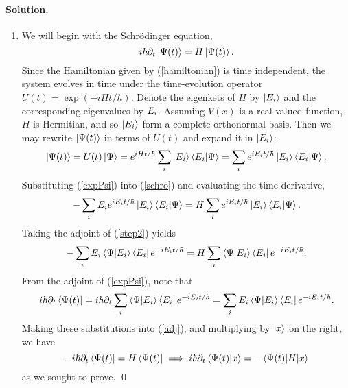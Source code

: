 \documentclass[11pt]{article}
\newcommand{\refeq}[1]{(\ref{#1})}
\newenvironment{solution}
{
    \paragraph{Solution.}
    \ignorespaces
}
{
}
\newcommand{\Schrodinger}{Schr\"{o}dinger}
\begin{document}
\begin{solution}
	\renewcommand{\theenumi}{\alph{enumi}}
	\begin{enumerate} \label{a}
		\item We will begin with the {\Schrodinger} equation,
			\begin{equation} \label{schro}
				i \hbar \partial_t \ket{\Psi(t)} = H \ket{\Psi(t)}.
			\end{equation}
			Since the Hamiltonian given by \refeq{hamiltonian} is time independent, the system evolves in time under the time-evolution operator $U(t) = \exp(-i H t / \hbar)$.  Denote the eigenkets of $H$ by $\ket{E_i}$ and the corresponding eigenvalues by $E_i$.  Assuming $V(x)$ is a real-valued function, $H$ is Hermitian, and so $\ket{E_i}$ form a complete orthonormal basis.  Then we may rewrite $\ket{\Psi(t)}$ in terms of $U(t)$ and expand it in $\ket{E_i}$:
			\begin{equation} \label{expPsi}
				\ket{\Psi(t)} = U(t) \ket{\Psi} = e^{i H t / \hbar} \sum_i \ket{E_i} \braket{E_i}{\Psi} = \sum_i e^{i E_i t / \hbar} \ket{E_i} \braket{E_i}{\Psi}.
			\end{equation}
			Substituting \refeq{expPsi} into \refeq{schro} and evaluating the time derivative,
			\begin{equation} \label{step2}
				-\sum_i E_i e^{i E_i t / \hbar} \ket{E_i} \braket{E_i}{\Psi} = H \sum_i e^{i E_i t / \hbar} \ket{E_i} \braket{E_i}{\Psi}.
			\end{equation}
			Taking the adjoint of \refeq{step2} yields
			\begin{equation} \label{adj}
				-\sum_i E_i \braket{\Psi}{E_i} \bra{E_i} e^{-i E_i t / \hbar} = H \sum_i \braket{\Psi}{E_i} \bra{E_i} e^{-i E_i t / \hbar}.
			\end{equation}
			From the adjoint of \refeq{expPsi}, note that
			\begin{equation}
				i \hbar \partial_t \bra{\Psi(t)} = i \hbar \partial_t \sum_i \braket{\Psi}{E_i} \bra{E_i} e^{-i E_i t / \hbar} = \sum_i E_i \braket{\Psi}{E_i} \bra{E_i} e^{-i E_i t / \hbar}.
			\end{equation}
			Making these substitutions into \refeq{adj}, and multiplying by $\ket{x}$ on the right, we have
			\begin{equation}
				-i \hbar \partial_t \bra{\Psi(t)} = H \bra{\Psi(t)} \implies i \hbar \partial_t \braket{\Psi(t)}{x} = - \mel{\Psi(t)}{H}{x}
			\end{equation}
			as we sought to prove. \qed
			

\end{enumerate}
\end{solution}
\end{document}
